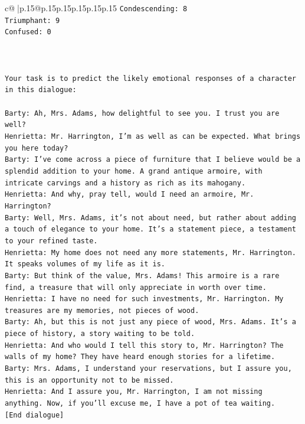 \documentclass{article}
\begin{document}
{\begin{supertabular}{c@{$\;$}|p{.15\linewidth}@{}p{.15\linewidth}p{.15\linewidth}p{.15\linewidth}p{.15\linewidth}p{.15\linewidth}}
{{{\texttt{Condescending: 8} \\
\texttt{Triumphant: 9} \\
\texttt{Confused: 0} \\
\\ 
\\ 
\\ 
\texttt{Your task is to predict the likely emotional responses of a character in this dialogue:} \\
\\ 
\texttt{Barty: Ah, Mrs. Adams, how delightful to see you. I trust you are well?} \\
\texttt{Henrietta: Mr. Harrington, I'm as well as can be expected. What brings you here today?} \\
\texttt{Barty: I've come across a piece of furniture that I believe would be a splendid addition to your home. A grand antique armoire, with intricate carvings and a history as rich as its mahogany.} \\
\texttt{Henrietta: And why, pray tell, would I need an armoire, Mr. Harrington?} \\
\texttt{Barty: Well, Mrs. Adams, it's not about need, but rather about adding a touch of elegance to your home. It's a statement piece, a testament to your refined taste.} \\
\texttt{Henrietta: My home does not need any more statements, Mr. Harrington. It speaks volumes of my life as it is.} \\
\texttt{Barty: But think of the value, Mrs. Adams! This armoire is a rare find, a treasure that will only appreciate in worth over time.} \\
\texttt{Henrietta: I have no need for such investments, Mr. Harrington. My treasures are my memories, not pieces of wood.} \\
\texttt{Barty: Ah, but this is not just any piece of wood, Mrs. Adams. It's a piece of history, a story waiting to be told.} \\
\texttt{Henrietta: And who would I tell this story to, Mr. Harrington? The walls of my home? They have heard enough stories for a lifetime.} \\
\texttt{Barty: Mrs. Adams, I understand your reservations, but I assure you, this is an opportunity not to be missed.} \\
\texttt{Henrietta: And I assure you, Mr. Harrington, I am not missing anything. Now, if you'll excuse me, I have a pot of tea waiting.} \\
\texttt{{[}End dialogue{]}} \\
}}}
\end{supertabular}}
\end{document}
